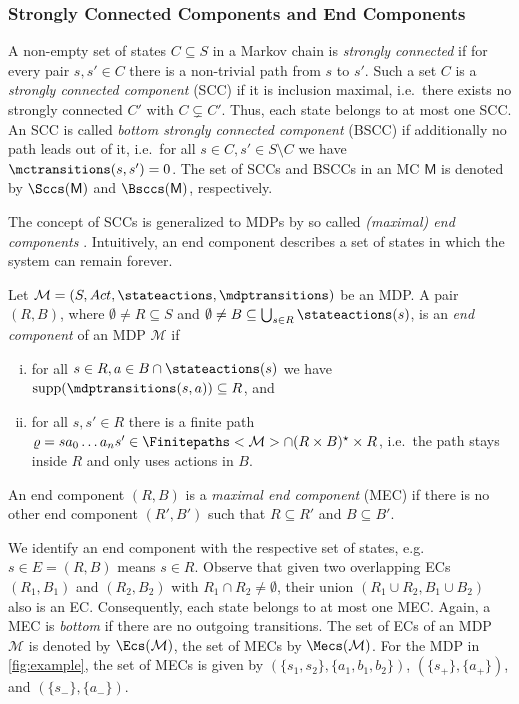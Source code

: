 \documentclass{theoretics}
\newcommand{\unionSym}{\cup}
\newcommand{\unionBin}{\mathbin{\unionSym}}
\newcommand{\intersectionSym}{\cap}
\newcommand{\intersectionBin}{\mathbin{\intersectionSym}}
\newcommand{\UnionSym}{\bigcup}
\newcommand{\union}{\unionBin}
\newcommand{\intersection}{\intersectionBin}
\newcommand{\Union}{\UnionSym}
\newcommand{\MC}{\mathsf{M}}
\newcommand{\MDP}{\mathcal{M}}
\newcommand{\States}{S}
\newcommand{\Actions}{Act}
\newcommand{\finitepath}{\varrho}
\DeclareMathOperator{\support}{supp}
\newcommand{\targetstate}{s_+}
\newcommand{\sinkstate}{s_-}
\begin{document}
\subsubsection*{Strongly Connected Components and End Components}
A non-empty set of states $C \subseteq \States$ in a Markov chain is \emph{strongly connected} if for every pair $s, s' \in C$ there is a non-trivial path from $s$ to $s'$.
Such a set $C$ is a \emph{strongly connected component} (SCC) if it is inclusion maximal, i.e.\ there exists no strongly connected $C'$ with $C \subsetneq C'$.
Thus, each state belongs to at most one SCC.
An SCC is called \emph{bottom strongly connected component} (BSCC) if additionally no path leads out of it, i.e.\ for all $s \in C, s' \in S \setminus C$ we have $\mctransitions(s, s') = 0$.
The set of SCCs and BSCCs in an MC $\MC$ is denoted by $\Sccs(\MC)$ and $\Bsccs(\MC)$, respectively.

The concept of SCCs is generalized to MDPs by so called \emph{(maximal) end components} \cite{de1997formal}.
Intuitively, an end component describes a set of states in which the system can remain forever.
\begin{definition} \label{def:ec}
	Let $\MDP = (\States, \Actions, \stateactions, \mdptransitions)$ be an MDP.
	A pair $(R, B)$, where $\emptyset \neq R \subseteq \States$ and $\emptyset \neq B \subseteq \Union_{s \in R} \stateactions(s)$, is an \emph{end component} of an MDP $\MDP$ if
	\begin{enumerate}[(i)]
		\item for all $s \in R, a \in B \intersection \stateactions(s)$ we have $\support(\mdptransitions(s, a)) \subseteq R$, and \label{def:ec:support}
		\item for all $s, s' \in R$ there is a finite path $\finitepath = s a_0 \dots a_n s' \in \Finitepaths<\MDP> \intersection (R \times B)^\star \times R$, i.e.\ the path stays inside $R$ and only uses actions in $B$. \label{def:ec:reach}
	\end{enumerate}
	An end component $(R, B)$ is a \emph{maximal end component} (MEC) if there is no other end component $(R', B')$ such that $R \subseteq R'$ and $B \subseteq B'$.
\end{definition}
We identify an end component with the respective set of states, e.g.\ $s \in E = (R, B)$ means $s \in R$.
Observe that given two overlapping ECs $(R_1, B_1)$ and $(R_2, B_2)$ with $R_1 \intersection R_2 \neq \emptyset$, their union $(R_1 \union R_2, B_1 \union B_2)$ also is an EC.
Consequently, each state belongs to at most one MEC.
Again, a MEC is \emph{bottom} if there are no outgoing transitions.
The set of ECs of an MDP $\MDP$ is denoted by $\Ecs(\MDP)$, the set of MECs by $\Mecs(\MDP)$.
For the MDP in \cref{fig:example}, the set of MECs is given by $(\{s_1, s_2\}, \{a_1, b_1, b_2\})$, $(\{\targetstate\}, \{a_+\})$, and $(\{\sinkstate\}, \{a_-\})$.
\end{document}
